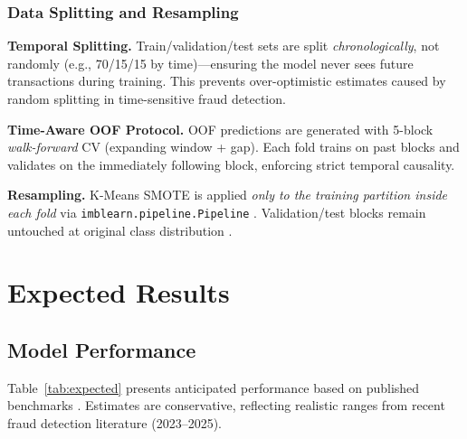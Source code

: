 \documentclass[10pt,a4paper,twocolumn]{article}
\begin{document}
\subsubsection{Data Splitting and Resampling}

\textbf{Temporal Splitting.} Train/validation/test sets are split \emph{chronologically}, not randomly (e.g., 70/15/15 by time)---ensuring the model never sees future transactions during training. This prevents over-optimistic estimates caused by random splitting in time-sensitive fraud detection.

\textbf{Time-Aware OOF Protocol.} OOF predictions are generated with 5-block \emph{walk-forward} CV (expanding window + gap). Each fold trains on past blocks and validates on the immediately following block, enforcing strict temporal causality.

\textbf{Resampling.} K-Means SMOTE is applied \emph{only to the training partition inside each fold} via \texttt{imblearn.pipeline.Pipeline} \cite{chawla2002}. Validation/test blocks remain untouched at original class distribution \cite{santos2018}.


\section{Expected Results}

\subsection{Model Performance}

Table~\ref{tab:expected} presents anticipated performance based on published benchmarks \cite{chen2016, ke2017}. Estimates are conservative, reflecting realistic ranges from recent fraud detection literature (2023--2025).
\end{document}
